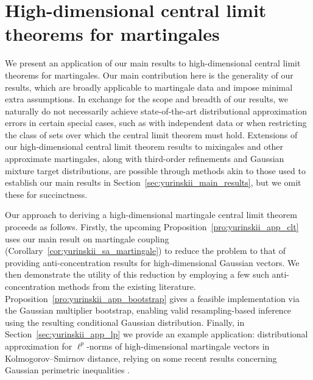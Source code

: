 \documentclass[11pt,lof]{puthesis}
\theoremstyle{break}
\theoremstyle{proof}
\begin{document}
\section{High-dimensional central limit theorems for martingales}%
\label{sec:yurinskii_app_high_dim_clt}

We present an application of our main results to
high-dimensional central limit theorems for martingales. Our main
contribution here is the generality of our results, which are broadly
applicable to martingale data and impose minimal extra assumptions. In exchange
for the scope and breadth of our results, we naturally do not necessarily
achieve state-of-the-art distributional approximation errors in certain special
cases, such as with independent data or when restricting the class of sets over
which the central limit theorem must hold. Extensions of our high-dimensional
central limit theorem results to mixingales and other approximate martingales,
along with third-order refinements and Gaussian mixture target distributions,
are possible through methods akin to those used to establish our main results
in Section~\ref{sec:yurinskii_main_results}, but we omit these for succinctness.

Our approach to deriving a high-dimensional martingale central limit theorem
proceeds as follows. Firstly, the upcoming
Proposition~\ref{pro:yurinskii_app_clt} uses our
main result on martingale coupling
(Corollary~\ref{cor:yurinskii_sa_martingale}) to
reduce the problem to that of providing anti-concentration results for
high-dimensional Gaussian vectors. We then demonstrate the utility of this
reduction by employing a few such anti-concentration methods from the existing
literature. Proposition~\ref{pro:yurinskii_app_bootstrap} gives a feasible
implementation via
the Gaussian multiplier bootstrap, enabling valid
resampling-based inference using
the resulting conditional Gaussian distribution. Finally, in
Section~\ref{sec:yurinskii_app_lp} we provide an example application:
distributional
approximation for $\ell^p$-norms of high-dimensional martingale vectors
in Kolmogorov--Smirnov distance, relying on some recent results
concerning Gaussian perimetric inequalities
\citep{nazarov2003maximal,kozbur2021dimension,
giessing2023anti,chernozhukov2017detailed}.
\end{document}
